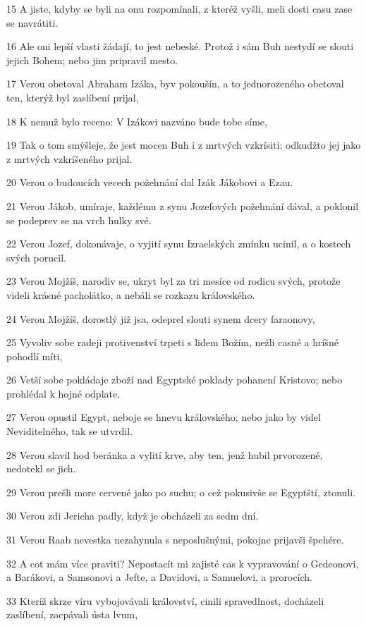\par 15 A jiste, kdyby se byli na onu rozpomínali, z kteréž vyšli, meli dosti casu zase se navrátiti.
\par 16 Ale oni lepší vlasti žádají, to jest nebeské. Protož i sám Buh nestydí se slouti jejich Bohem; nebo jim pripravil mesto.
\par 17 Verou obetoval Abraham Izáka, byv pokoušín, a to jednorozeného obetoval ten, kterýž byl zaslíbení prijal,
\par 18 K nemuž bylo receno: V Izákovi nazváno bude tobe síme,
\par 19 Tak o tom smýšleje, že jest mocen Buh i z mrtvých vzkrísiti; odkudžto jej jako z mrtvých vzkríšeného prijal.
\par 20 Verou o budoucích vecech požehnání dal Izák Jákobovi a Ezau.
\par 21 Verou Jákob, umíraje, každému z synu Jozefových požehnání dával, a poklonil se podeprev se na vrch hulky své.
\par 22 Verou Jozef, dokonávaje, o vyjití synu Izraelských zmínku ucinil, a o kostech svých porucil.
\par 23 Verou Mojžíš, narodiv se, ukryt byl za tri mesíce od rodicu svých, protože videli krásné pacholátko, a nebáli se rozkazu královského.
\par 24 Verou Mojžíš, dorostlý již jsa, odeprel slouti synem dcery faraonovy,
\par 25 Vyvoliv sobe radeji protivenství trpeti s lidem Božím, nežli casné a hríšné pohodlí míti,
\par 26 Vetší sobe pokládaje zboží nad Egyptské poklady pohanení Kristovo; nebo prohlédal k hojné odplate.
\par 27 Verou opustil Egypt, neboje se hnevu královského; nebo jako by videl Neviditelného, tak se utvrdil.
\par 28 Verou slavil hod beránka a vylití krve, aby ten, jenž hubil prvorozené, nedotekl se jich.
\par 29 Verou prešli more cervené jako po suchu; o cež pokusivše se Egyptští, ztonuli.
\par 30 Verou zdi Jericha padly, když je obcházeli za sedm dní.
\par 31 Verou Raab nevestka nezahynula s neposlušnými, pokojne prijavši špehére.
\par 32 A cot mám více praviti? Nepostacít mi zajisté cas k vypravování o Gedeonovi, a Barákovi, a Samsonovi a Jefte, a Davidovi, a Samuelovi, a prorocích.
\par 33 Kteríž skrze víru vybojovávali království, cinili spravedlnost, docházeli zaslíbení, zacpávali ústa lvum,
